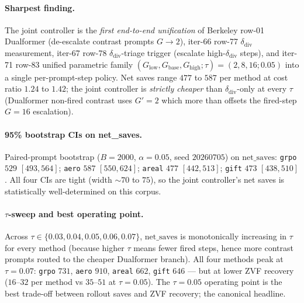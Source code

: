 \documentclass{article}
\begin{document}
\paragraph{Sharpest finding.}
The joint controller is the \emph{first end-to-end unification} of
Berkeley row-01 Dualformer (de-escalate contrast prompts $G{\to}2$),
iter-66 row-77 $\delta_{\mathrm{div}}$ measurement, iter-67 row-78
$\delta_{\mathrm{div}}$-triage trigger (escalate high-$\delta_{\mathrm{div}}$
steps), and iter-71 row-83 unified parametric family
$(G_{\mathrm{low}}, G_{\mathrm{base}}, G_{\mathrm{high}}; \tau)
= (2, 8, 16; 0.05)$ into a single per-prompt-step policy. Net saves
range $477$ to $587$ per method at cost ratio $1.24$ to $1.42$; the
joint controller is \emph{strictly cheaper} than
$\delta_{\mathrm{div}}$-only at every $\tau$ (Dualformer non-fired
contrast uses $G'{=}2$ which more than offsets the fired-step $G{=}16$
escalation).

\paragraph{95\% bootstrap CIs on net\_saves.}
Paired-prompt bootstrap ($B{=}2000$, $\alpha{=}0.05$, seed $20260705$)
on $\mathrm{net\_saves}$: \texttt{grpo} $529$ $[493, 564]$;
\texttt{aero} $587$ $[550, 624]$; \texttt{areal} $477$ $[442, 513]$;
\texttt{gift} $473$ $[438, 510]$. All four CIs are tight (width
$\sim 70$ to $75$), so the joint controller's net saves is statistically
well-determined on this corpus.

\paragraph{$\tau$-sweep and best operating point.}
Across $\tau \in \{0.03, 0.04, 0.05, 0.06, 0.07\}$, $\mathrm{net\_saves}$
is monotonically increasing in $\tau$ for every method (because higher
$\tau$ means fewer fired steps, hence more contrast prompts routed to
the cheaper Dualformer branch). All four methods peak at
$\tau{=}0.07$: \texttt{grpo} $731$, \texttt{aero} $910$,
\texttt{areal} $662$, \texttt{gift} $646$ — but at lower ZVF recovery
($16$–$32$ per method vs $35$–$51$ at $\tau{=}0.05$). The
$\tau{=}0.05$ operating point is the best trade-off between rollout
saves and ZVF recovery; the canonical headline.
\end{document}
